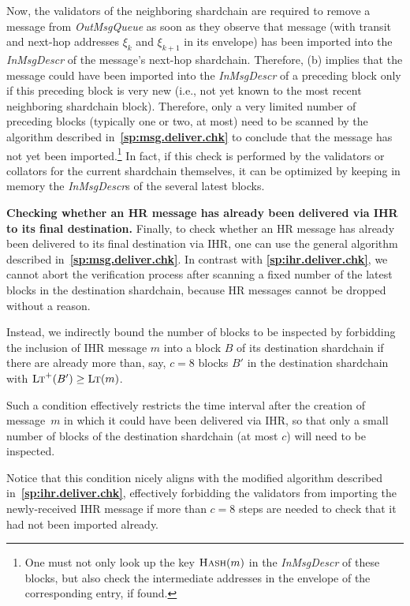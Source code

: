 \documentclass[12pt,oneside]{article}
\def\makepoint#1{\medbreak\noindent{\bf #1.\ }}
\def\nxsubpoint{\refstepcounter{subsubsection}%
  \smallbreak\makepoint{\thesubsubsection}}
\def\refpoint#1{{\rm\textbf{\ref{#1}}}}
\let\ptref=\refpoint
\def\emb#1{\textbf{#1.}}
\def\opsc#1{\operatorname{\textsc{#1}}}
\def\Hash{\opsc{Hash}}
\def\LT{\opsc{Lt}}
\begin{document}
Now, the validators of the neighboring shardchain are required to remove a message from {\em OutMsgQueue\/} as soon as they observe that message (with transit and next-hop addresses $\xi_k$ and $\xi_{k+1}$ in its envelope) has been imported into the {\em InMsgDescr\/} of the message's next-hop shardchain. Therefore, (b) implies that the message could have been imported into the {\em InMsgDescr\/} of a preceding block only if this preceding block is very new (i.e., not yet known to the most recent neighboring shardchain block). Therefore, only a very limited number of preceding blocks (typically one or two, at most)  need to be scanned by the algorithm described in~\ptref{sp:msg.deliver.chk} to conclude that the message has not yet been imported.\footnote{One must not only look up the key $\Hash(m)$ in the {\em InMsgDescr\/} of these blocks, but also check the intermediate addresses in the envelope of the corresponding entry, if found.} In fact, if this check is performed by the validators or collators for the current shardchain themselves, it can be optimized by keeping in memory the {\em InMsgDescr\/}s of the several latest blocks.

\nxsubpoint\label{sp:hr.ihr.deliver.chk}\emb{Checking whether an HR message has already been delivered via IHR to its final destination}
Finally, to check whether an HR message has already been delivered to its final destination via IHR, one can use the general algorithm described in~\ptref{sp:msg.deliver.chk}. In contrast with \ptref{sp:ihr.deliver.chk}, we cannot abort the verification process after scanning a fixed number of the latest blocks in the destination shardchain, because HR messages cannot be dropped without a reason.

Instead, we indirectly bound the number of blocks to be inspected by forbidding the inclusion of IHR message $m$ into a block $B$ of its destination shardchain if there are already more than, say, $c=8$ blocks $B'$ in the destination shardchain with $\LT^+(B')\geq\LT(m)$.

Such a condition effectively restricts the time interval after the creation of message~$m$ in which it could have been delivered via IHR, so that only a small number of blocks of the destination shardchain (at most $c$) will need to be inspected.

Notice that this condition nicely aligns with the modified algorithm described in~\ptref{sp:ihr.deliver.chk}, effectively forbidding the validators from importing the newly-received IHR message if more than $c=8$ steps are needed to check that it had not been imported already.
\end{document}

